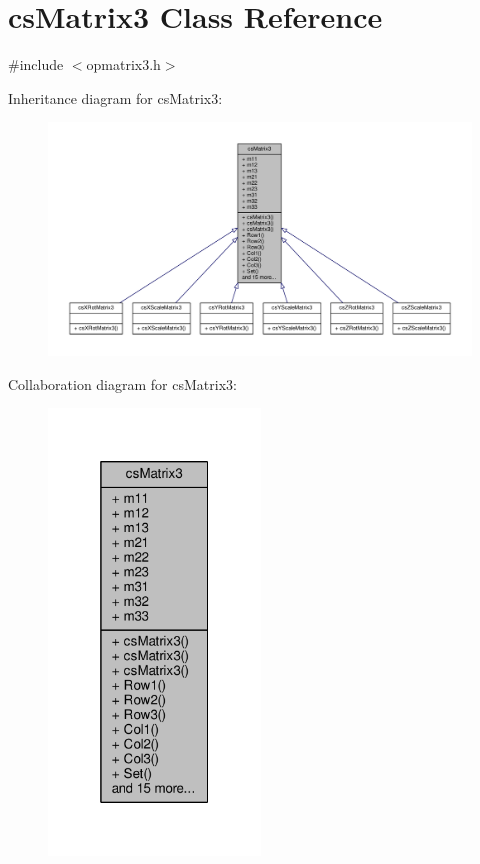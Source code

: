 \hypertarget{classcsMatrix3}{}\section{cs\+Matrix3 Class Reference}
\label{classcsMatrix3}


{\ttfamily \#include $<$opmatrix3.\+h$>$}



Inheritance diagram for cs\+Matrix3\+:
\nopagebreak
\begin{figure}[H]
\begin{center}
\leavevmode
\includegraphics[width=350pt]{d3/d99/classcsMatrix3__inherit__graph}
\end{center}
\end{figure}


Collaboration diagram for cs\+Matrix3\+:
\nopagebreak
\begin{figure}[H]
\begin{center}
\leavevmode
\includegraphics[width=160pt]{d3/d77/classcsMatrix3__coll__graph}
\end{center}
\end{figure}
